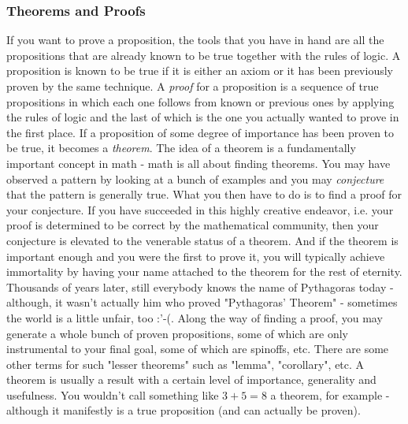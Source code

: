 \subsubsection{Theorems and Proofs}
If you want to prove a proposition, the tools that you have in hand are all the propositions that are already known to be true together with the rules of logic. A proposition is known to be true if it is either an axiom or it has been previously proven by the same technique. A \emph{proof} for a proposition is a sequence of true propositions in which each one follows from known or previous ones by applying the rules of logic and the last of which is the one you actually wanted to prove in the first place. If a proposition of some degree of importance has been proven to be true, it becomes a \emph{theorem}. The idea of a theorem is a fundamentally important concept in math - math is all about finding theorems. You may have observed a pattern by looking at a bunch of examples and you may \emph{conjecture} that the pattern is generally true. What you then have to do is to find a proof for your conjecture. If you have succeeded in this highly creative endeavor, i.e. your proof is determined to be correct by the mathematical community, then your conjecture is elevated to the venerable status of a theorem. And if the theorem is important enough and you were the first to prove it, you will typically achieve immortality by having your name attached to the theorem for the rest of eternity. Thousands of years later, still everybody knows the name of Pythagoras today - although, it wasn't actually him who proved "Pythagoras' Theorem" - sometimes the world is a little unfair, too :'-(. Along the way of finding a proof, you may generate a whole bunch of proven propositions, some of which are only instrumental to your final goal, some of which are spinoffs, etc. There are some other terms for such "lesser theorems" such as "lemma", "corollary", etc. A theorem is usually a result with a certain level of importance, generality and usefulness. You wouldn't call something like $3+5=8$ a theorem, for example - although it manifestly is a true proposition (and can actually be proven).

